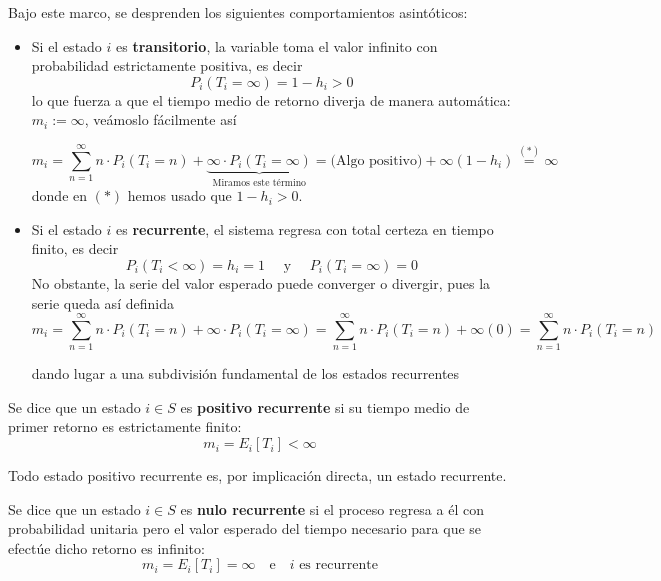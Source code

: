\documentclass[10pt]{book}
\begin{document}
\noindent
Bajo este marco, se desprenden los siguientes comportamientos asintóticos:
\begin{itemize}
    \item Si el estado $i$ es \textbf{transitorio}, la variable toma el valor infinito con probabilidad estrictamente positiva, es decir
    $$P_i(T_i = \infty) = 1 - h_i > 0$$ 
    lo que fuerza a que el tiempo medio de retorno diverja de manera automática: $m_i := \infty$, veámoslo fácilmente así

    \begin{equation*}
        m_i = \sum_{n=1}^{\infty} n \cdot P_i(T_i = n) + \underbrace{\infty \cdot P_i(T_i = \infty)}_{\text{Miramos este término}} =\text{(Algo positivo)} + \infty(1-h_i) \overset{(*)}{=} \infty 
    \end{equation*}
    donde en $(*)$ hemos usado que $1-h_i > 0$.
    \item Si el estado $i$ es \textbf{recurrente}, el sistema regresa con total certeza en tiempo finito, es decir
    $$P_i(T_i < \infty) = h_i = 1 \quad \text{ y } \quad P_i(T_i=\infty)=0$$
    No obstante, la serie del valor esperado puede converger o divergir, pues la serie queda así definida
    \begin{equation*}
        m_i = \sum_{n=1}^{\infty} n \cdot P_i(T_i = n) + \infty \cdot P_i(T_i = \infty) =\sum_{n=1}^{\infty} n \cdot P_i(T_i = n) + \infty(0) = \sum_{n=1}^{\infty} n \cdot P_i(T_i = n)
    \end{equation*}
    
    dando lugar a una subdivisión fundamental de los estados recurrentes
\end{itemize}

\begin{definicion}
    Se dice que un estado $i \in S$ es \textbf{positivo recurrente} si su tiempo medio de primer retorno es estrictamente finito:
    \[
    m_i = E_i[T_i] < \infty
    \]
\end{definicion}
\begin{observacion}
    Todo estado positivo recurrente es, por implicación directa, un estado recurrente.
\end{observacion}

\begin{definicion}
    Se dice que un estado $i \in S$ es \textbf{nulo recurrente} si el proceso regresa a él con probabilidad unitaria pero el valor esperado del tiempo necesario para que se efectúe dicho retorno es infinito:
    \[
    m_i = E_i[T_i] = \infty \quad \text{e} \quad i \text{ es recurrente}
    \]
\end{definicion}
\end{document}

